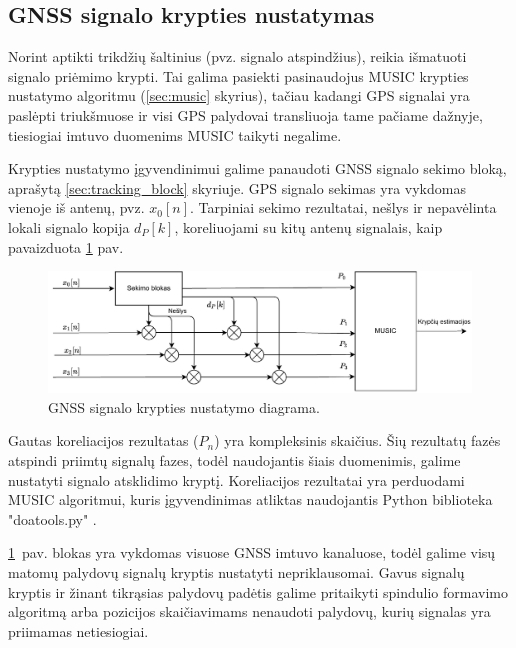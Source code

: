 \documentclass[main.tex]{subfiles}
\begin{document}
\subsection{GNSS signalo krypties nustatymas}\label{sec:gnss_doa_block}

Norint aptikti trikdžių šaltinius (pvz. signalo atspindžius), reikia išmatuoti
signalo priėmimo krypti. Tai galima pasiekti pasinaudojus MUSIC krypties nustatymo
algoritmu (\ref{sec:music} skyrius), tačiau kadangi GPS signalai yra paslėpti triukšmuose
ir visi GPS palydovai transliuoja tame pačiame dažnyje,
tiesiogiai imtuvo duomenims MUSIC taikyti negalime.

Krypties nustatymo įgyvendinimui galime panaudoti GNSS signalo sekimo bloką,
aprašytą \ref{sec:tracking_block} skyriuje. GPS signalo sekimas yra vykdomas
vienoje iš antenų, pvz. $x_0[n]$. Tarpiniai sekimo rezultatai, nešlys ir
nepavėlinta lokali signalo kopija $d_P[k]$, koreliuojami su
kitų antenų signalais, kaip pavaizduota \ref{fig:gnss_sdr_tracking_block_doa}
pav.

\begin{figure}[h]
    \begin{centering}
    \includegraphics[scale=0.85]{drawings/tracking_diagram_doa}
    \par\end{centering}
    \protect\caption{\label{fig:gnss_sdr_tracking_block_doa}GNSS signalo krypties nustatymo diagrama.}
\end{figure}

Gautas koreliacijos rezultatas ($P_n$) yra kompleksinis skaičius. Šių
rezultatų fazės atspindi priimtų signalų fazes, todėl naudojantis
šiais duomenimis, galime nustatyti signalo atsklidimo kryptį.
Koreliacijos rezultatai yra perduodami MUSIC algoritmui, kuris
įgyvendinimas atliktas naudojantis Python biblioteka "doatools.py" \cite{7738579}.

\ref{fig:gnss_sdr_tracking_block_doa}~pav. blokas yra vykdomas visuose
GNSS imtuvo kanaluose, todėl galime visų matomų palydovų signalų kryptis
nustatyti nepriklausomai. Gavus signalų kryptis ir žinant tikrąsias
palydovų padėtis galime pritaikyti spindulio formavimo algoritmą
arba pozicijos skaičiavimams nenaudoti palydovų, kurių signalas
yra priimamas netiesiogiai.
\end{document}
